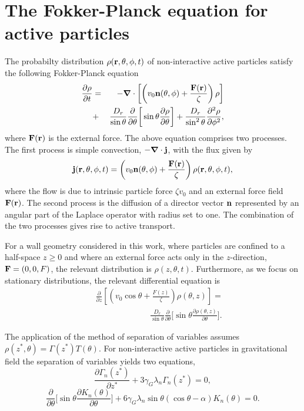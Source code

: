 \documentclass[pre,twocolumn,graphicx]{revtex4-1}
\newcommand{\bnabla}{\mbox{\boldmath $\nabla$}}
\newcommand{\ba}{\begin{eqnarray}}
\newcommand{\ea}{\end{eqnarray}}
\newcommand{\be}{\begin{equation}}
\newcommand{\ee}{\end{equation}}
\begin{document}
\section{The Fokker-Planck equation for active particles}
\label{sec:anal0}
The probabilty distribution $\rho({\bf r},\theta,\phi,t)$ of non-interactive active particles satisfy the following 
Fokker-Planck equation
\ba
\frac{\partial\rho}{\partial t} 
&=& -\bnabla\cdot\left[\left(v_0 {\bf n} (\theta,\phi) 
+ \frac{{\bf F}({\bf r})}{\zeta}\right)\rho\right]  \nonumber\\
&+&\frac{D_r}{\sin\theta}\frac{\partial}{\partial\theta}\bigg[\sin\theta\frac{\partial\rho}{\partial\theta}\bigg]
+ \frac{D_r}{\sin^2\theta}\frac{\partial^2\rho}{\partial\phi^2},
\label{eq:FP}
\ea
where ${\bf F}({\bf r})$ is the external force.  The above equation comprises two processes.  
The first process is simple convection, $-\bnabla\cdot {\bf j}$, with the flux given by 
\be
{\bf j} ({\bf r},\theta,\phi,t) = \left(v_0 {\bf n}(\theta,\phi) + \frac{{\bf F}({\bf r})}{\zeta}\right)\rho({\bf r},\theta,\phi,t),  
\ee
where the flow is due to intrinsic particle force $\zeta v_0$ and an external force field ${\bf F}({\bf r})$.  
The second process is the diffusion of a director vector ${\bf n}$ represented by an angular part of the Laplace 
operator with radius set to one.  The combination of the two processes gives rise to active transport.  

For a wall geometry considered in this work, where particles are confined to a half-space $z\ge 0$ and 
where an external force acts only in the $z$-direction, ${\bf F}=(0,0,F)$, the relevant distribution is 
$\rho(z,\theta,t)$.  Furthermore, as we focus on stationary distributions, the relevant differential equation is 
\ba
&&\frac{\partial}{\partial z}\left[\left(v_0\cos\theta  + \frac{F(z)}{\zeta}\right)\rho(\theta,z)\right]  = \nonumber\\ 
&&~~~~~~~~~~~~~~~~~~~~~~~~~~~~~~
\frac{D_r}{\sin\theta}\frac{\partial}{\partial\theta}\bigg[\sin\theta\frac{\partial\rho(\theta,z)}{\partial\theta}\bigg].
\label{eq:FP1Da}
\ea


The application of the method of separation of variables assumes $\rho(z^*,\theta)=\Gamma(z^*)T(\theta)$.  
For non-interactive active particles in gravitational field the separation of variables yields two equations, 
\be
\frac{\partial\Gamma_n(z^*)}{\partial z^*}  + 3\gamma_G\lambda_n \Gamma_n(z^*) = 0, 
\label{eq:SV1}
\ee
\be
\frac{\partial}{\partial\theta}\bigg[\sin\theta\frac{\partial K_n(\theta)}{\partial\theta}\bigg]
+ 6\gamma_G\lambda_n \sin\theta(\cos\theta - \alpha) K_n(\theta) = 0.  
\label{eq:SV2}
\ee
\end{document}
